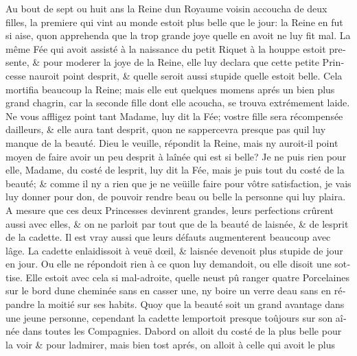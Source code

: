 \documentclass[14pt,a4paper]{memoir}
\begin{document}
{{\begin{otherlanguage}{french}
Au bout de sept ou huit ans la Reine d\textquotesingle un Royaume voisin
accoucha de deux filles, la premiere qui vint au monde estoit plus belle
que le jour: la Reine en fut si aise, qu\textquotesingle on apprehenda
que la trop grande joye qu\textquotesingle elle en avoit ne luy fit mal.
La même Fée qui avoit assisté à la naissance du petit Riquet à la houppe
estoit presente, \& pour moderer la joye de la Reine, elle luy declara
que cette petite Princesse n\textquotesingle auroit point
d\textquotesingle esprit, \& qu\textquotesingle elle seroit aussi
stupide qu\textquotesingle elle estoit belle. Cela mortifia beaucoup la
Reine; mais elle eut quelques momens aprés un bien plus grand chagrin,
car la seconde fille dont elle acoucha, se trouva extrémement laide. Ne
vous affligez point tant Madame, luy dit la Fée; vostre fille sera
récompensée d\textquotesingle ailleurs, \& elle aura tant
d\textquotesingle esprit, qu\textquotesingle on ne
s\textquotesingle appercevra presque pas qu\textquotesingle il luy
manque de la beauté. Dieu le veuille, répondit la Reine, mais
n\textquotesingle y auroit-il point moyen de faire avoir un peu
d\textquotesingle esprit à l\textquotesingle aînée qui est si belle? Je
ne puis rien pour elle, Madame, du costé de l\textquotesingle esprit,
luy dit la Fée, mais je puis tout du costé de la beauté; \& comme il
n\textquotesingle y a rien que je ne veüille faire pour vôtre
satisfaction, je vais luy donner pour don, de pouvoir rendre beau ou
belle la personne qui luy plaira. A mesure que ces deux Princesses
devinrent grandes, leurs perfections crûrent aussi avec elles, \& on ne
parloit par tout que de la beauté de l\textquotesingle aisnée, \& de
l\textquotesingle esprit de la cadette. Il est vray aussi que leurs
défauts augmenterent beaucoup avec l\textquotesingle âge. La cadette
enlaidissoit à veuë d\textquotesingle œil, \& l\textquotesingle aisnée
devenoit plus stupide de jour en jour. Ou elle ne répondoit rien à ce
qu\textquotesingle on luy demandoit, ou elle disoit une sottise. Elle
estoit avec cela si mal-adroite, qu\textquotesingle elle
n\textquotesingle eust pû ranger quatre Porcelaines sur le bord
d\textquotesingle une cheminée sans en casser une, ny boire un verre
d\textquotesingle eau sans en répandre la moitié sur ses habits. Quoy
que la beauté soit un grand avantage dans une jeune personne, cependant
la cadette l\textquotesingle emportoit presque toûjours sur son aînée
dans toutes les Compagnies. D\textquotesingle abord on alloit du costé
de la plus belle pour la voir \& pour l\textquotesingle admirer, mais
bien tost aprés, on alloit à celle qui avoit le plus

\end{otherlanguage}}}
\end{document}
